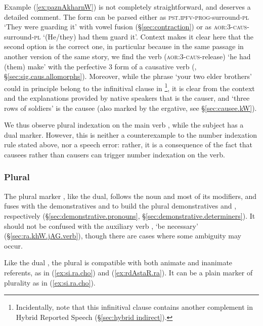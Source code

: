 Example (\ref{ex:paznAkharnW}) is not completely straightforward, and deserves a detailed comment. The form  can be parsed either as  \textsc{pst}.\textsc{ipfv}-\textsc{prog}-surround-\textsc{pl} `They were guarding it' with vowel fusion (§\ref{sec:contraction}) or as  \textsc{aor}:3\flobv{}-\textsc{caus}-surround-\textsc{pl} `(He/they) had them guard it'. Context makes it clear here that the second option is the correct one, in particular because in the same passage in another version of the same story, we find the verb  (\textsc{aor}:3\flobv{}-\textsc{caus}-release) `he had (them) make' with the perfective 3\flobv{} form of a causative verb (\citealt[242]{jacques16complementation}, §\ref{sec:sig.caus.allomorphs}). Moreover, while the phrase   `your two elder brothers' could in principle belong to the infinitival clause in \footnote{Incidentally, note that this infinitival clause contains another complement in Hybrid Reported Speech (§\ref{sec:hybrid indirect}).}, it is clear from the context and the explanations provided by native speakers that  is the causer, and  `three rows of soldiers' is the causee (also marked by the ergative, see §\ref{sec:causee.kW}). 


We thus observe plural indexation  on the main verb , while the subject   has a dual marker. However, this is neither a counterexample to the number indexation rule stated above, nor a speech error: rather, it is a consequence of the fact that causees rather than causers can trigger number indexation on the verb.

\subsubsection{Plural} \label{sec:plural.determiners}
 
The plural marker , like the dual, follows the noun and most of its modifiers, and fuses with the demonstratives  and  to build the plural demonstratives  and , respectively (§\ref{sec:demonstrative.pronouns}, §\ref{sec:demonstrative.determiners}).  It should not be confused with the auxiliary verb , `be necessary' (§\ref{sec:ra.khW.jAG.verb}), though there are cases where some ambiguity may occur.

Like the dual , the plural  is compatible with both animate and inanimate referents, as in (\ref{ex:si.ra.cho}) and (\ref{ex:rdAstaR.ra}). It can be a plain marker of plurality as in (\ref{ex:si.ra.cho}).

